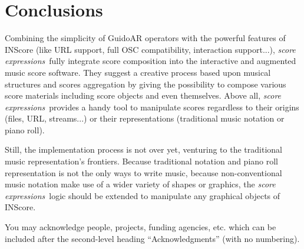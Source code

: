 \documentclass{article}
\newenvironment{ExprCode}		{\vspace{-2mm} \small\verbatim}{\endverbatim\vspace{-2mm}}
\newcommand{\sExpr}{\emph{score expressions}}
\begin{document}
\section{Conclusions}

Combining the simplicity of GuidoAR operators with the powerful features of INScore (like URL support, full OSC compatibility, interaction support...), \sExpr\ fully integrate score composition into the interactive and augmented music score software. They suggest a creative process based upon musical structures and scores aggregation by giving the possibility to compose various score materials including score objects and even themselves. Above all, \sExpr\ provides a handy tool to manipulate scores regardless to their origins (files, URL, streams...) or their representations (traditional music notation or piano roll).

Still, the implementation process is not over yet, venturing to the traditional music representation's frontiers. Because traditional notation and piano roll representation is not the only ways to write music, because non-conventional music notation make use of a wider variety of shapes or graphics, the \sExpr\ logic should be extended to manipulate any graphical objects of INScore.


\begin{acknowledgments}
You may acknowledge people, projects, 
funding agencies, etc. 
which can be included after the second-level heading
``Acknowledgments'' (with no numbering).
\end{acknowledgments} 



%               
%      
\end{document}
